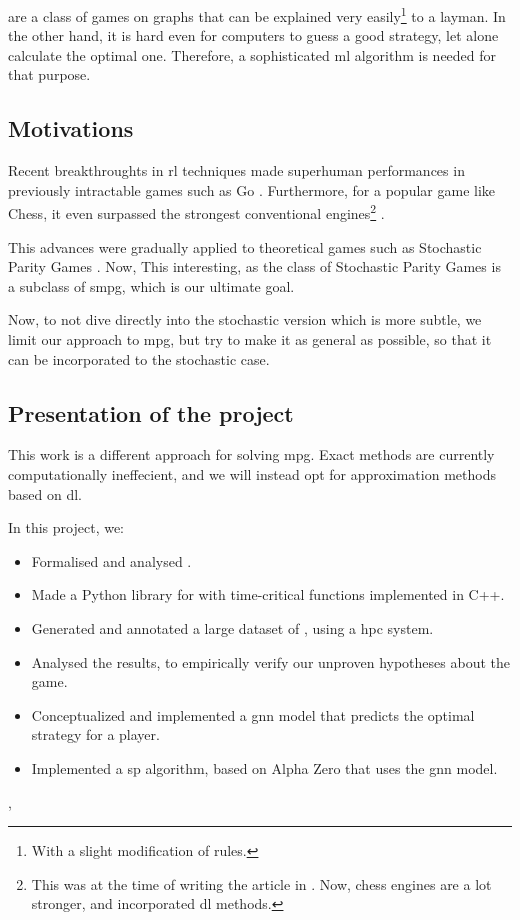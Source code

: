  are a class of games on graphs that can be explained very easily\footnote{With a slight modification of rules.} to a layman. In the other hand, it is hard even for computers to guess a good strategy, let alone calculate the optimal one. Therefore, a sophisticated \acrshort{ml} algorithm is needed for that purpose.

\subsection{Motivations}
Recent breakthroughts in \acrlong{rl} techniques made superhuman performances in previously intractable games such as Go \cite{AlphaGo}.
\newline Furthermore, for a popular game like Chess, it even surpassed the strongest conventional engines\footnote{This was at the time of writing the article in . Now, chess engines are a lot stronger, and incorporated \acrshort{dl} methods.} \cite{AlphaZero}. 

This advances were gradually applied to theoretical games such as Stochastic Parity Games \cite{ModelFreeParityGame}.
\newline Now, This interesting, as the class of Stochastic Parity Games is a subclass of \acrfull{smpg}, which is our ultimate goal.

Now, to not dive directly into the stochastic version which is more subtle, we limit our approach to \acrfull{mpg}, but try to make it as general as possible, so that it can be incorporated to the stochastic case. 

\subsection{Presentation of the project}
This work is a different approach for solving \acrshort{mpg}. Exact methods are currently computationally ineffecient, and we will instead opt for approximation methods based on \acrshort{dl}.

In this project, we:
\begin{itemize}
	\item Formalised and analysed  .
	\item Made a Python library for  with time-critical functions implemented in C++.
	\item Generated and annotated a large dataset of , using a \acrfull{hpc} system.
	\item Analysed the results, to empirically verify our unproven hypotheses about the game.
	\item Conceptualized and implemented a \acrfull{gnn} model that predicts the optimal strategy for a player.
	\item Implemented a \acrfull{sp} algorithm, based on Alpha Zero \cite{AlphaZero} that uses the \acrshort{gnn} model. 
\end{itemize}, 

